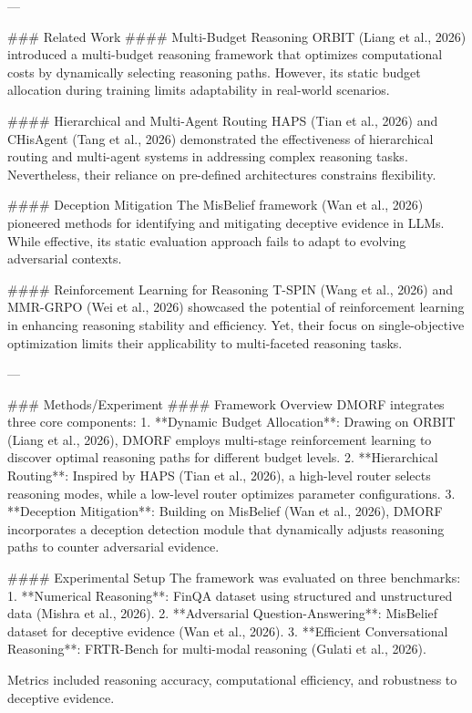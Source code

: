 ---

### Related Work
#### Multi-Budget Reasoning
ORBIT (Liang et al., 2026) introduced a multi-budget reasoning framework that optimizes computational costs by dynamically selecting reasoning paths. However, its static budget allocation during training limits adaptability in real-world scenarios.

#### Hierarchical and Multi-Agent Routing
HAPS (Tian et al., 2026) and CHisAgent (Tang et al., 2026) demonstrated the effectiveness of hierarchical routing and multi-agent systems in addressing complex reasoning tasks. Nevertheless, their reliance on pre-defined architectures constrains flexibility.

#### Deception Mitigation
The MisBelief framework (Wan et al., 2026) pioneered methods for identifying and mitigating deceptive evidence in LLMs. While effective, its static evaluation approach fails to adapt to evolving adversarial contexts.

#### Reinforcement Learning for Reasoning
T-SPIN (Wang et al., 2026) and MMR-GRPO (Wei et al., 2026) showcased the potential of reinforcement learning in enhancing reasoning stability and efficiency. Yet, their focus on single-objective optimization limits their applicability to multi-faceted reasoning tasks.

---

### Methods/Experiment
#### Framework Overview
DMORF integrates three core components:
1. **Dynamic Budget Allocation**: Drawing on ORBIT (Liang et al., 2026), DMORF employs multi-stage reinforcement learning to discover optimal reasoning paths for different budget levels.
2. **Hierarchical Routing**: Inspired by HAPS (Tian et al., 2026), a high-level router selects reasoning modes, while a low-level router optimizes parameter configurations.
3. **Deception Mitigation**: Building on MisBelief (Wan et al., 2026), DMORF incorporates a deception detection module that dynamically adjusts reasoning paths to counter adversarial evidence.

#### Experimental Setup
The framework was evaluated on three benchmarks:
1. **Numerical Reasoning**: FinQA dataset using structured and unstructured data (Mishra et al., 2026).
2. **Adversarial Question-Answering**: MisBelief dataset for deceptive evidence (Wan et al., 2026).
3. **Efficient Conversational Reasoning**: FRTR-Bench for multi-modal reasoning (Gulati et al., 2026).

Metrics included reasoning accuracy, computational efficiency, and robustness to deceptive evidence.

